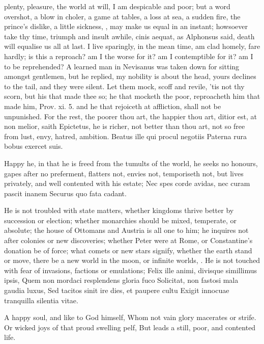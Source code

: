 {plenty, pleasure, the world at will, I am despicable and poor; but a
word overshot, a blow in choler, a game at tables, a loss at sea, a
sudden fire, the prince's dislike, a little sickness, \etc{}, may make us
equal in an instant; howsoever take thy time, triumph and insult
awhile, cinis aequat, as Alphonsus said, death will equalise us
all at last. I live sparingly, in the mean time, am clad homely, fare
hardly; is this a reproach? am I the worse for it? am I contemptible
for it? am I to be reprehended? A learned man in  Nevisanus was
taken down for sitting amongst gentlemen, but he replied, my nobility
is about the head, yours declines to the tail, and they were silent.
Let them mock, scoff and revile, 'tis not thy scorn, but his that made
thee so; he that mocketh the poor, reproacheth him that made him, Prov.
xi. 5. and he that rejoiceth at affliction, shall not be unpunished.
For the rest, the poorer thou art, the happier thou art, ditior est, at
non melior, saith Epictetus, he is richer, not better than thou
art, not so free from lust, envy, hatred, ambition.
Beatus ille qui procul negotiis
Paterna rura bobus exercet suis.

Happy he, in that he is freed from the tumults of the world, he
seeks no honours, gapes after no preferment, flatters not, envies not,
temporiseth not, but lives privately, and well contented with his
estate;
Nec spes corde avidas, nec curam pascit inanem
Securus quo fata cadant.

He is not troubled with state matters, whether kingdoms thrive better
by succession or election; whether monarchies should be mixed,
temperate, or absolute; the house of Ottomans and Austria is all one to
him; he inquires not after colonies or new discoveries; whether Peter
were at Rome, or Constantine's donation be of force; what comets or new
stars signify, whether the earth stand or move, there be a new world in
the moon, or infinite worlds, \etc{}. He is not touched with fear of
invasions, factions or emulations;
Felix ille animi, divisque simillimus ipsis,
Quem non mordaci resplendens gloria fuco
Solicitat, non fastosi mala gaudia luxus,
Sed tacitos sinit ire dies, et paupere cultu
 Exigit innocuae tranquilla silentia vitae.

A happy soul, and like to God himself,
Whom not vain glory macerates or strife.
Or wicked joys of that proud swelling pelf,
But leads a still, poor, and contented life.

}
